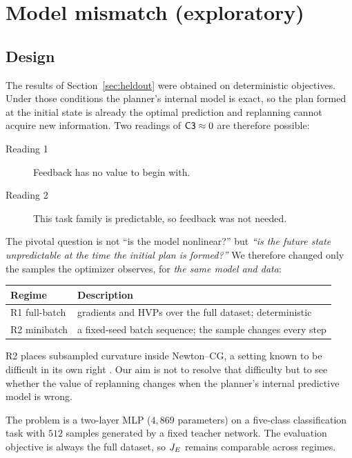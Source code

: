 \section{Model mismatch (exploratory)}
\label{sec:mismatch}

\subsection{Design}

The results of Section~\ref{sec:heldout} were obtained on deterministic objectives.
Under those conditions the planner's internal model is exact, so the plan formed at
the initial state is already the optimal prediction and replanning cannot acquire
new information. Two readings of $\textsf{C3} \approx 0$ are therefore possible:

\begin{description}
  \item[Reading 1] Feedback has no value to begin with.
  \item[Reading 2] This task family is predictable, so feedback was not needed.
\end{description}

The pivotal question is not ``is the model nonlinear?'' but \emph{``is the future
state unpredictable at the time the initial plan is formed?''} We therefore changed
only the samples the optimizer observes, for \emph{the same model and data}:

\begin{center}
\begin{tabular}{ll}
\toprule
Regime & Description \\
\midrule
R1 full-batch & gradients and HVPs over the full dataset; deterministic \\
R2 minibatch  & a fixed-seed batch sequence; the sample changes every step \\
\bottomrule
\end{tabular}
\end{center}

R2 places subsampled curvature inside Newton--CG, a setting known to be difficult
in its own right \citep{byrd2011stochastic}. Our aim is not to resolve that
difficulty but to see whether the value of replanning changes when the planner's
internal predictive model is wrong.

The problem is a two-layer MLP ($4{,}869$ parameters) on a five-class
classification task with $512$ samples generated by a fixed teacher network. The
evaluation objective is always the full dataset, so $J_E$ remains comparable across
regimes.

